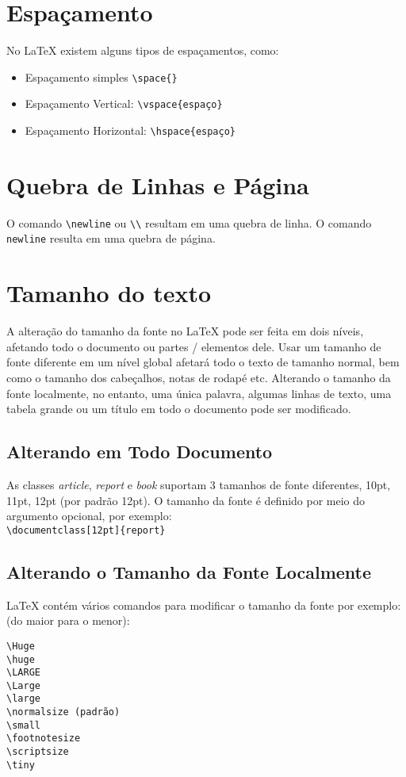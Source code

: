 \section{Espaçamento}

No LaTeX existem alguns tipos de espaçamentos, como: \\

 \begin{itemize}
    \item Espaçamento simples \verb|\space{}|
    \item Espaçamento Vertical: \verb|\vspace{espaço}|
    \item Espaçamento Horizontal: \verb|\hspace{espaço}|
\end{itemize}

\section{Quebra de Linhas e Página}

O comando \verb|\newline| ou \verb|\\| resultam em uma quebra de linha. 
O comando \verb|newline| resulta em uma quebra de página.

\section{Tamanho do texto}

A alteração do tamanho da fonte no \LaTeX{} pode ser feita em dois níveis, afetando todo o documento ou partes / elementos dele.
Usar um tamanho de fonte diferente em um nível global afetará todo o texto de tamanho normal, bem como o tamanho dos cabeçalhos, notas de rodapé etc.
Alterando o tamanho da fonte localmente, no entanto, uma única palavra, algumas linhas de texto, uma tabela grande ou um título em todo o documento
pode ser modificado.

\subsection{Alterando em Todo Documento}

As classes \textit{article}, \textit{report} e \textit{book} suportam 3 tamanhos de fonte diferentes, 10pt, 11pt, 12pt (por padrão 12pt).
O tamanho da fonte é definido por meio do argumento opcional, por exemplo: \\

\verb|\documentclass[12pt]{report}|

\subsection{Alterando o Tamanho da Fonte Localmente}

\LaTeX{} contém vários comandos para modificar o tamanho da fonte por exemplo: (do maior para o menor):

\begin{verbatim}
\Huge
\huge
\LARGE
\Large
\large
\normalsize (padrão)
\small
\footnotesize
\scriptsize
\tiny
\end{verbatim}